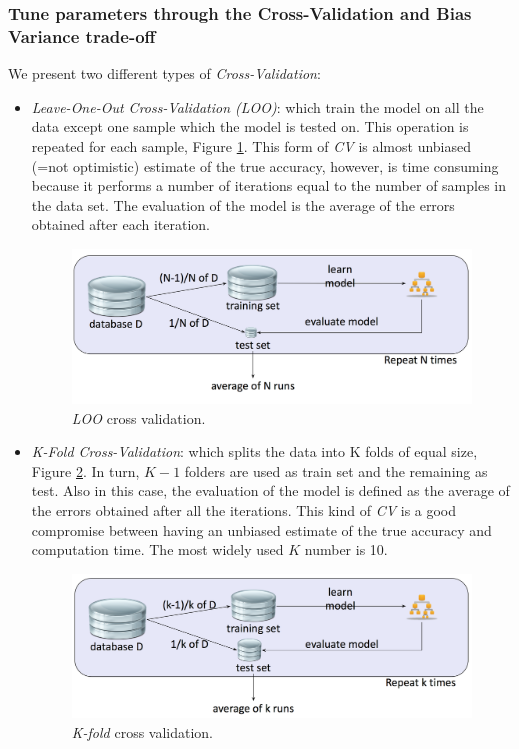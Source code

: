 \subsubsection*{Tune parameters through the Cross-Validation and Bias Variance trade-off}

We present two different types of \emph{Cross-Validation}:
\begin{itemize}
\item \emph{Leave-One-Out Cross-Validation (LOO)}: which train the model on all the data except one sample which the model is tested on. This operation is repeated for each sample, Figure \ref{pic:loo}. This form of \emph{CV}  is almost unbiased (=not optimistic) estimate of the true accuracy, however, is time consuming because it performs a number of iterations equal to the number of samples in the data set. The evaluation of the model is the average of the errors obtained after each iteration.

\begin{figure}[H]%
 \centering
 \includegraphics[width=13cm]{./img/08/loo}
 \caption{\label{pic:loo} \emph{LOO} cross validation.}
\end{figure}

\item \emph{K-Fold Cross-Validation}: which splits the data into K folds of equal size, Figure \ref{pic:kfold}. In turn, $K-1$ folders are used as train set and the remaining as test. Also in this case, the evaluation of the model is defined as the average of the errors obtained after all the iterations. This kind of \emph{CV} is a good compromise between having an unbiased estimate of the true accuracy and computation time. The most widely used $K$ number is 10.

\begin{figure}[H]%
 \centering
 \includegraphics[width=13cm]{./img/08/kfold}
 \caption{\label{pic:kfold} \emph{K-fold} cross validation.}
\end{figure}

\end{itemize}

